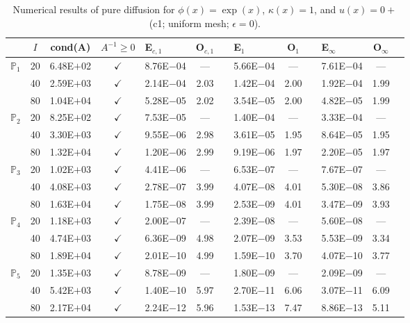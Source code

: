 \begin{table}[H]
\centering
\caption{Numerical results of pure diffusion for $\phi(x)=\exp(x)$, $\kappa(x)=1$, and $u(x)=0+$ (c1; uniform mesh; $\epsilon=0$).}
\begin{tabular}{@{}l c c c l c c l c c l c c@{}}
\toprule
 & $I$ & cond(A) & $A^{-1}\geq 0$ &  E$_{c,1}$ & O$_{c,1}$ && E$_1$ & O$_1$ && E$_{\infty}$ & O$_{\infty}$\\
\midrule
\multirow{3}{*}{$\mathbb{P}_{1}$}
 & 20 & 6.48E$+$02 & $\checkmark$ & 8.76E$-$04 & --- && 5.66E$-$04 & --- && 7.61E$-$04 & ---\\
 & 40 & 2.59E$+$03 & $\checkmark$ & 2.14E$-$04 & 2.03 && 1.42E$-$04 & 2.00 && 1.92E$-$04 & 1.99\\
 & 80 & 1.04E$+$04 & $\checkmark$ & 5.28E$-$05 & 2.02 && 3.54E$-$05 & 2.00 && 4.82E$-$05 & 1.99\\
\midrule
\multirow{3}{*}{$\mathbb{P}_{2}$}
 & 20 & 8.25E$+$02 & $\checkmark$ & 7.53E$-$05 & --- && 1.40E$-$04 & --- && 3.33E$-$04 & ---\\
 & 40 & 3.30E$+$03 & $\checkmark$ & 9.55E$-$06 & 2.98 && 3.61E$-$05 & 1.95 && 8.64E$-$05 & 1.95\\
 & 80 & 1.32E$+$04 & $\checkmark$ & 1.20E$-$06 & 2.99 && 9.19E$-$06 & 1.97 && 2.20E$-$05 & 1.97\\
\midrule
\multirow{3}{*}{$\mathbb{P}_{3}$}
 & 20 & 1.02E$+$03 & $\checkmark$ & 4.41E$-$06 & --- && 6.53E$-$07 & --- && 7.67E$-$07 & ---\\
 & 40 & 4.08E$+$03 & $\checkmark$ & 2.78E$-$07 & 3.99 && 4.07E$-$08 & 4.01 && 5.30E$-$08 & 3.86\\
 & 80 & 1.63E$+$04 & $\checkmark$ & 1.75E$-$08 & 3.99 && 2.53E$-$09 & 4.01 && 3.47E$-$09 & 3.93\\
\midrule
\multirow{3}{*}{$\mathbb{P}_{4}$}
 & 20 & 1.18E$+$03 & $\checkmark$ & 2.00E$-$07 & --- && 2.39E$-$08 & --- && 5.60E$-$08 & ---\\
 & 40 & 4.74E$+$03 & $\checkmark$ & 6.36E$-$09 & 4.98 && 2.07E$-$09 & 3.53 && 5.53E$-$09 & 3.34\\
 & 80 & 1.89E$+$04 & $\checkmark$ & 2.01E$-$10 & 4.99 && 1.59E$-$10 & 3.70 && 4.07E$-$10 & 3.77\\
\midrule
\multirow{3}{*}{$\mathbb{P}_{5}$}
 & 20 & 1.35E$+$03 & $\checkmark$ & 8.78E$-$09 & --- && 1.80E$-$09 & --- && 2.09E$-$09 & ---\\
 & 40 & 5.42E$+$03 & $\checkmark$ & 1.40E$-$10 & 5.97 && 2.70E$-$11 & 6.06 && 3.07E$-$11 & 6.09\\
 & 80 & 2.17E$+$04 & $\checkmark$ & 2.24E$-$12 & 5.96 && 1.53E$-$13 & 7.47 && 8.86E$-$13 & 5.11\\
\bottomrule
\end{tabular}
\end{table}